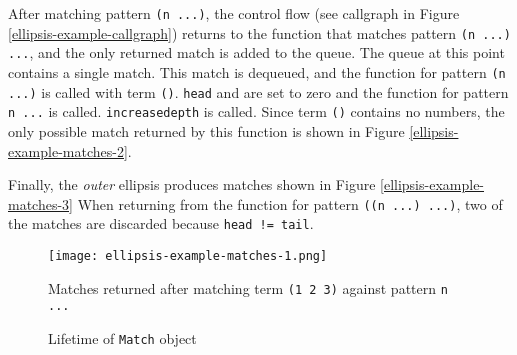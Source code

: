 After matching pattern \texttt{(n ...)}, the control flow (see callgraph in Figure \ref{ellipsis-example-callgraph}) returns to the function that matches pattern \texttt{(n ...) ...}, and the only returned match is added to the queue. The queue at this point contains a single match. This match is dequeued, and the function for pattern \texttt{(n ...)} is called with term \texttt{()}. \texttt{head} and  are set to zero and the function for pattern \texttt{n ...} is called. \texttt{increasedepth} is called. Since term \texttt{()} contains no numbers, the only possible match returned by this function is shown in Figure \ref{ellipsis-example-matches-2}.

Finally, the \textit{outer} ellipsis produces matches shown in Figure \ref{ellipsis-example-matches-3} When returning from the function for pattern \texttt{((n ...) ...)}, two of the matches are discarded because \texttt{head != tail}.


\begin{figure}[!htb]
\texttt{[image: ellipsis-example-matches-1.png]}
\caption{Matches returned after matching term \texttt{(1 2 3)} against pattern \texttt{n ...}}
\label{ellipsis-example-matches-1}
\end{figure}

\begin{figure}[H]
\caption{Lifetime of \texttt{Match} object}


\end{figure}

